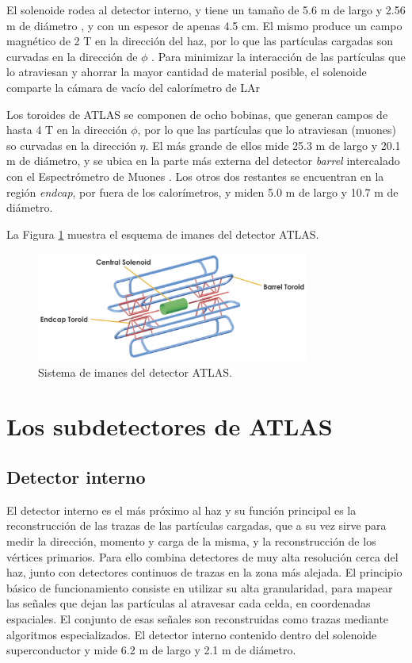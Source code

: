 El solenoide rodea al detector interno, y tiene un tamaño de 5.6 m de largo y 2.56 m de diámetro 
, y con un espesor de apenas 4.5 cm. El mismo produce un campo magnético de 2 T en la dirección del haz, por lo que las partículas cargadas son curvadas en la dirección de $\phi$ 
. Para minimizar la interacción de las partículas que lo atraviesan y ahorrar la mayor cantidad de material posible, el solenoide comparte la cámara de vacío del calorímetro de LAr %

Los toroides de ATLAS se componen de ocho bobinas, que generan campos de hasta 4 T 
en la dirección $\phi$, por lo que las partículas que lo atraviesan (muones) so curvadas en la dirección $\eta$. El más grande de ellos mide 25.3 m de largo y 20.1 m de diámetro, y se ubica en la parte más externa del detector \textit{barrel} intercalado con el Espectrómetro de Muones %
. Los otros dos restantes se encuentran en la región \textit{endcap}, por fuera de los calorímetros, y miden 5.0 m de largo y 10.7 m de diámetro. 

La Figura \ref{magnet_1} muestra el esquema de imanes del detector ATLAS.

\begin{figure}
\centering
  \includegraphics[width=0.8\textwidth]{images/magnet_1.png}
  \caption{Sistema de imanes del detector ATLAS.}
  \label{magnet_1}
\end{figure}


\section{Los subdetectores de ATLAS}

\subsection{Detector interno}

El detector interno es el más próximo al haz y su función principal es la reconstrucción de las trazas de las partículas cargadas, que a su vez sirve para medir la dirección, momento y carga de la misma, y la reconstrucción de los vértices primarios. Para ello combina detectores de muy alta resolución cerca del haz, junto con detectores continuos de trazas en la zona más alejada. El principio básico de funcionamiento consiste en utilizar su alta granularidad, para mapear las señales que dejan las partículas al atravesar cada celda, en coordenadas espaciales. El conjunto de esas señales son reconstruidas como trazas mediante algoritmos especializados. El detector interno contenido dentro del solenoide superconductor y mide 6.2 m de largo y 2.1 m de diámetro. 

